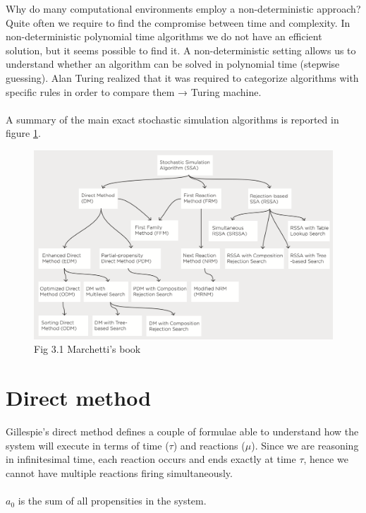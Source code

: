   \noindent
  Why do many computational environments employ a non-deterministic approach? Quite often we require to find the compromise between time and complexity.
  In non-deterministic polynomial time algorithms we do not have an efficient solution, but it seems possible to find it.
  A non-deterministic setting allows us to understand whether an algorithm can be solved in polynomial time (stepwise guessing).
  Alan Turing realized that it was required to categorize algorithms with specific rules in order to compare them → Turing machine.
  \\
  \\
  \noindent
  A summary of the main exact stochastic simulation algorithms is reported in figure \ref{fig:tree}.
  \begin{figure}
    \centering
    \includegraphics[width=\textwidth]{tree_methods.png}
    \caption{Fig 3.1 Marchetti's book}
    \label{fig:tree}
  \end{figure}

\section{Direct method}
Gillespie's direct method defines a couple of formulae able to understand how the system will execute in terms of time ($\tau$) and reactions ($\mu$).
Since we are reasoning in infinitesimal time, each reaction occurs and ends exactly at time $\tau$, hence we cannot have multiple reactions firing simultaneously.
\\
\\
\noindent
 $a_0$ is the sum of all propensities in the system.

